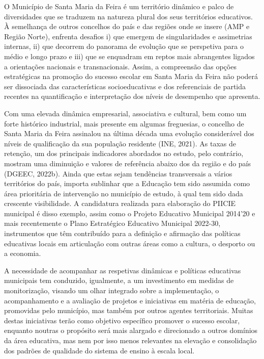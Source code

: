 \documentclass[
]{book}
\begin{document}
O Município de Santa Maria da Feira é um território dinâmico e palco de diversidades que se traduzem na natureza plural dos seus territórios educativos. À semelhança de outros concelhos do país e das regiões onde se insere (AMP e Região Norte), enfrenta desafios i) que emergem de singularidades e assimetrias internas, ii) que decorrem do panorama de evolução que se perspetiva para o médio e longo prazo e iii) que se enquadram em reptos mais abrangentes ligados a orientações nacionais e transnacionais. Assim, a compreensão das opções estratégicas na promoção do sucesso escolar em Santa Maria da Feira não poderá ser dissociada das características socioeducativas e dos referenciais de partida recentes na quantificação e interpretação dos níveis de desempenho que apresenta.

Com uma elevada dinâmica empresarial, associativa e cultural, bem como um forte histórico industrial, mais presente em algumas freguesias, o concelho de Santa Maria da Feira assinalou na última década uma evolução considerável dos níveis de qualificação da sua população residente (INE, 2021). As taxas de retenção, um dos principais indicadores abordados no estudo, pelo contrário, mostram uma diminuição e valores de referência abaixo dos da região e do país (DGEEC, 2022b). Ainda que estas sejam tendências transversais a vários territórios do país, importa sublinhar que a Educação tem sido assumida como área prioritária de intervenção no município de estudo, à qual tem sido dada crescente visibilidade. A candidatura realizada para elaboração do PIICIE municipal é disso exemplo, assim como o Projeto Educativo Municipal 2014'20 e mais recentemente o Plano Estratégico Educativo Municipal 2022-30, instrumentos que têm contribuído para a definição e afirmação das políticas educativas locais em articulação com outras áreas como a cultura, o desporto ou a economia.

A necessidade de acompanhar as respetivas dinâmicas e políticas educativas municipais tem conduzido, igualmente, a um investimento em medidas de monitorização, visando um olhar integrado sobre a implementação, o acompanhamento e a avaliação de projetos e iniciativas em matéria de educação, promovidas pelo município, mas também por outros agentes territoriais. Muitas destas iniciativas terão como objetivo específico promover o sucesso escolar, enquanto noutras o propósito será mais alargado e direcionado a outros domínios da área educativa, mas nem por isso menos relevantes na elevação e consolidação dos padrões de qualidade do sistema de ensino à escala local.
\end{document}
